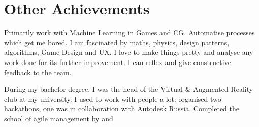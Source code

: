 \documentclass[]{cv-class}
\begin{document}
\begin{minipage}[t]{0.64\textwidth}
\smallSeparator{.5pt}
\section{Other Achievements}
    \small{
    Primarily work with Machine Learning in Games and CG. Automatise processes which get me bored. I am fascinated by maths, physics, design patterns, algorithms, Game Design and UX. I love to make things pretty and analyse any work done for its further improvement. I can reflex and give constructive feedback to the team.
    
    \forceindent During my bachelor degree, I was the head of the Virtual \& Augmented Reality club at my university. I used to work with people a lot: organised two hackathons, one was in collaboration with Autodesk Russia. Completed the school of agile management by  and 
    }
\end{minipage}
\end{document}
